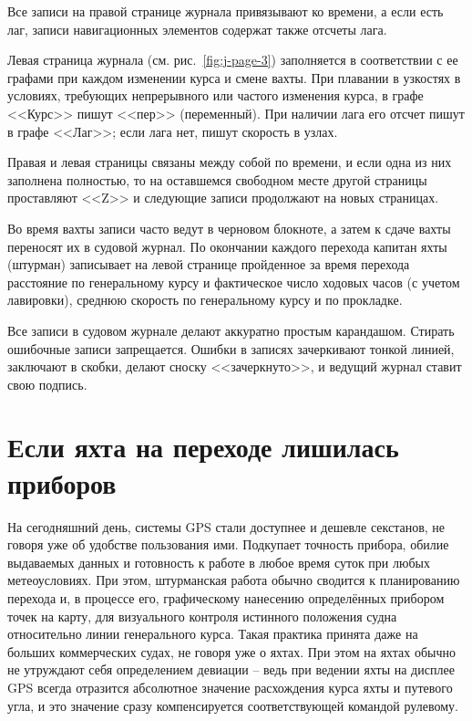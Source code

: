 \documentclass[a4paper, 12pt, twoside, final, book, russian, fittopage, cyremdash]{ncc}
\newcommand{\ris}[1]{\ref{fig:#1}}
\begin{document}
Все записи на правой странице журнала привязывают ко времени, а если есть лаг, записи навигационных элементов содержат также отсчеты лага.

Левая страница журнала (см. рис.~\ris{j-page-3}) заполняется в соответствии с ее графами при каждом изменении курса и смене вахты. При плавании в узкостях в условиях, требующих непрерывного или частого изменения курса, в графе <<Курс>> пишут <<пер>> (переменный). При наличии лага его отсчет пишут в графе <<Лаг>>; если лага нет, пишут скорость в узлах. 

Правая и левая страницы связаны между собой по времени, и если одна из них заполнена полностью, то на оставшемся свободном месте другой страницы проставляют <<Z>> и следующие записи продолжают на новых страницах.

Во время вахты записи часто ведут в черновом блокноте, а затем к сдаче вахты переносят их в судовой журнал. По окончании каждого перехода капитан яхты (штурман) записывает на левой странице пройденное за время перехода расстояние по генеральному курсу и фактическое число ходовых часов (с учетом лавировки), среднюю скорость по генеральному курсу и по прокладке.

Все записи в судовом журнале делают аккуратно простым карандашом. Стирать ошибочные записи запрещается. Ошибки в записях зачеркивают тонкой линией, заключают в скобки, делают сноску <<зачеркнуто>>, и ведущий журнал ставит свою подпись.

\section{Если яхта на переходе лишилась приборов}

На сегодняшний день, системы GPS стали доступнее и дешевле секстанов, не говоря уже об удобстве пользования ими. Подкупает точность прибора, обилие выдаваемых данных и готовность к работе в любое время суток при любых метеоусловиях. При этом, штурманская работа обычно сводится к планированию перехода и, в процессе его, графическому нанесению определённых прибором точек на карту, для визуального контроля истинного положения судна относительно линии генерального курса. Такая практика принята даже на больших коммерческих судах, не говоря уже о яхтах. При этом на яхтах обычно не утруждают себя определением девиации \--- ведь при ведении яхты на дисплее GPS всегда отразится абсолютное значение расхождения курса яхты и путевого угла, и это значение сразу компенсируется соответствующей командой рулевому. 
\end{document}
